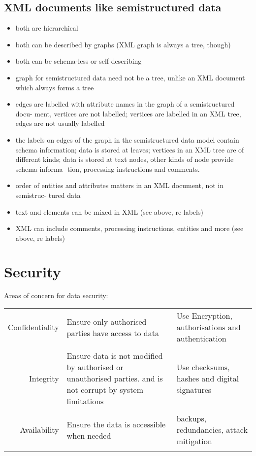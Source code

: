 \documentclass[10pt]{article}
\begin{document}
        \subsection*{XML documents like semistructured data}
          \begin{itemize}
            \item both are hierarchical
            \item both can be described by graphs (XML graph is always a tree, though) 
            \item both can be schema-less or self describing
            \item graph for semistructured data need not be a tree, unlike an XML document which always forms a tree
            \item edges are labelled with attribute names in the graph of a semistructured docu- ment, vertices are not labelled; vertices are labelled in an XML tree, edges are not usually labelled
            \item the labels on edges of the graph in the semistructured data model contain schema information; data is stored at leaves; vertices in an XML tree are of different kinds; data is stored at text nodes, other kinds of node provide schema informa- tion, processing instructions and comments.
            \item order of entities and attributes matters in an XML document, not in semistruc- tured data
            \item text and elements can be mixed in XML (see above, re labels)
            \item XML can include comments, processing instructions, entities and more (see above, re labels)
          \end{itemize}

  \section*{Security}
    Areas of concern for data security:\\
    \begin{tabular}{r | p{6cm} | p{6cm} } 
      Confidentiality & Ensure only authorised parties have access to data & Use Encryption, authorisations and authentication\\ & & \\
      Integrity & Ensure data is not modified by authorised or unauthorised parties. and is not corrupt by system limitations & Use checksums, hashes and digital signatures\\ & & \\
      Availability & Ensure the data is accessible when needed & backups, redundancies, attack mitigation\\ & & \\
    \end{tabular}
\end{document}
